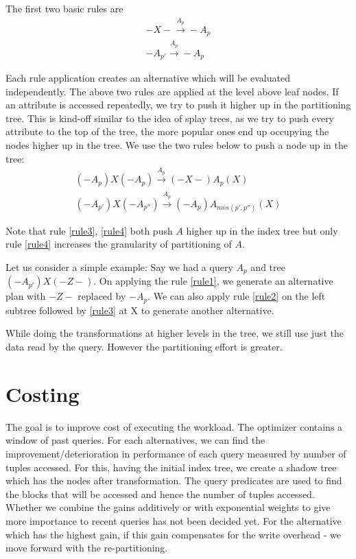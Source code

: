 \documentclass[18pt]{article}
\begin{document}
The first two basic rules are 
\begin{eqnarray}
- X - \xrightarrow{A_p} - A_p \label{rule1} \\
- A_{p'}  \xrightarrow{A_p} - A_p  \label{rule2}
\end{eqnarray}

 Each rule application creates an alternative which will be evaluated independently. The above two rules are applied at the level above leaf nodes. If an attribute is accessed repeatedly, we try to push it higher up in the partitioning tree. This is kind-off similar to the idea of splay trees, as we try to push every attribute to the top of the tree, the more popular ones end up occupying the nodes higher up in the tree. We use the two rules below to push a node up in the tree:
\begin{eqnarray}
 (- A_p) X (- A_p) \xrightarrow{A_p} (- X -) A_p (X) \label{rule3} \\
 (- A_{p'}) X (- A_{p''}) \xrightarrow{A_p} (- A_{p})  A_{min(p',p'')} ( X ) \label{rule4}
\end{eqnarray}

Note that rule \ref{rule3}, \ref{rule4} both push $A$ higher up in the index tree but only rule \ref{rule4} increases the granularity of partitioning of $A$. 

Let us consider a simple example: Say we had a query $A_p$ and tree $(- A_{p'} ) X (- Z -)$. On applying the rule \ref{rule1}, we generate an alternative plan with $- Z -$ replaced by $- A_p$. We can also apply rule \ref{rule2} on the left subtree followed by \ref{rule3} at X to generate another alternative. 

While doing the transformations at higher levels in the tree, we still use just the data read by the query. However the partitioning effort is greater. 

\section{Costing}

The goal is to improve cost of executing the workload.
The optimizer contains a window of past queries. For each alternatives, we can find the improvement/deterioration in performance of each query measured by number of tuples accessed. For this, having the initial index tree, we create a shadow tree which has the nodes after transformation. The query predicates are used to find the blocks that will be accessed and hence the number of tuples accessed. 
Whether we combine the gains additively or with exponential weights to give more importance to recent queries has not been decided yet. For the alternative which has the highest gain, if this gain compensates for the write overhead - we move forward with the re-partitioning.
\end{document}
